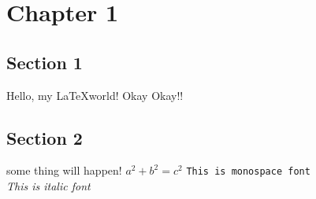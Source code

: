 \documentclass[a4paper, 12pt]{report}
\begin{document}
	\chapter{Chapter 1}
		\section{Section 1}
		Hello, my \LaTeX world!
		Okay
		Okay!!
		\cleardoublepage
		\section{Section 2}
		some thing will happen!
		$ a^2 + b^2 = c^2 $
		\texttt{This is monospace font}
		\\
		\textit{This is italic font}
\end{document}
